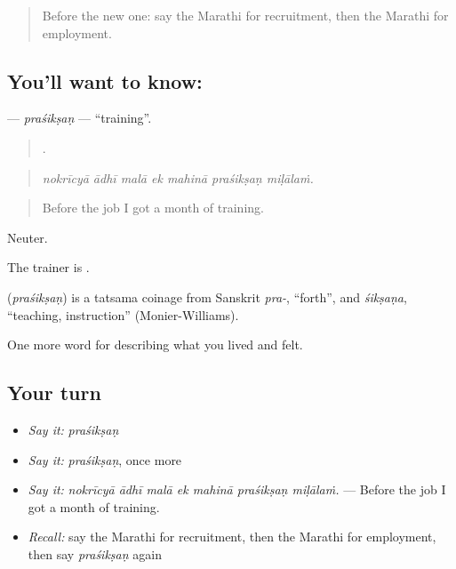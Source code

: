 \label{lesson:MR-C507-prasiksan}



\begin{quote}
Before the new one: say the Marathi for recruitment, then the Marathi for employment.
\end{quote}

\subsection*{You'll want to know: }
\textbf{} — \emph{praśikṣaṇ} — \textquotedblleft{}training\textquotedblright{}.

\begin{quote}
      .
\end{quote}

\begin{quote}
\emph{nokrīcyā ādhī malā ek mahinā praśikṣaṇ miḷālaṁ.}
\end{quote}

\begin{quote}
Before the job I got a month of training.
\end{quote}

Neuter.

The trainer is .

\begin{cousinweb}
\textbf{} (\emph{praśikṣaṇ}) is a tatsama coinage from Sanskrit \emph{pra-}, \textquotedblleft{}forth\textquotedblright{}, and \emph{śikṣaṇa}, \textquotedblleft{}teaching, instruction\textquotedblright{} (Monier-Williams).
\end{cousinweb}

\begin{grammarlens}[title={What you've built}]
One more word for describing what you lived and felt.
\end{grammarlens}

\subsection*{Your turn}
\begin{itemize}
\raggedright
  \item \emph{Say it:} \emph{praśikṣaṇ}
  \item \emph{Say it:} \emph{praśikṣaṇ}, once more
  \item \emph{Say it:} \emph{nokrīcyā ādhī malā ek mahinā praśikṣaṇ miḷālaṁ.} — Before the job I got a month of training.
  \item \emph{Recall:} say the Marathi for recruitment, then the Marathi for employment, then say \emph{praśikṣaṇ} again
\end{itemize}

